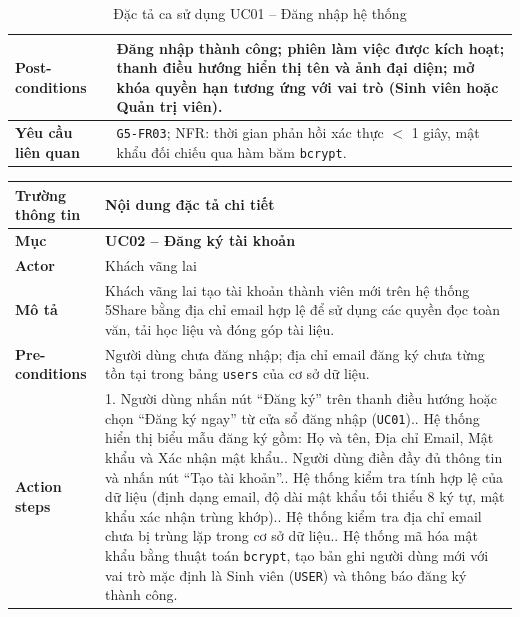 \begin{table}[H]
\begin{tabularx}{\textwidth}{|p{3.5cm}|X|}
\hline
\textbf{Post-conditions} & Đăng nhập thành công; phiên làm việc được kích hoạt; thanh điều hướng hiển thị tên và ảnh đại diện; mở khóa quyền hạn tương ứng với vai trò (Sinh viên hoặc Quản trị viên). \\
\hline
\textbf{Yêu cầu liên quan} & \texttt{G5-FR03}; NFR: thời gian phản hồi xác thực $<$ 1 giây, mật khẩu đối chiếu qua hàm băm \texttt{bcrypt}. \\
\hline
\end{tabularx}
\caption{Đặc tả ca sử dụng UC01 -- Đăng nhập hệ thống}
\label{tab:uc01}
\end{table}


\begin{table}[H]
\centering
\footnotesize\linespread{1.05}\selectfont
\setlength{\tabcolsep}{5pt}
\renewcommand{\arraystretch}{1.12}
\begin{tabularx}{\textwidth}{|p{3.5cm}|X|}
\hline
\rowcolor[HTML]{EAEAEA}
\textbf{Trường thông tin} & \textbf{Nội dung đặc tả chi tiết} \\
\hline
\textbf{Mục} & \textbf{UC02 -- Đăng ký tài khoản} \\
\hline
\textbf{Actor} & Khách vãng lai \\
\hline
\textbf{Mô tả} & Khách vãng lai tạo tài khoản thành viên mới trên hệ thống 5Share bằng địa chỉ email hợp lệ để sử dụng các quyền đọc toàn văn, tải học liệu và đóng góp tài liệu. \\
\hline
\textbf{Pre-conditions} & Người dùng chưa đăng nhập; địa chỉ email đăng ký chưa từng tồn tại trong bảng \texttt{users} của cơ sở dữ liệu. \\
\hline
\textbf{Action steps} & 1. Người dùng nhấn nút ``Đăng ký'' trên thanh điều hướng hoặc chọn ``Đăng ký ngay'' từ cửa sổ đăng nhập (\texttt{UC01}).\newline 2. Hệ thống hiển thị biểu mẫu đăng ký gồm: Họ và tên, Địa chỉ Email, Mật khẩu và Xác nhận mật khẩu.\newline 3. Người dùng điền đầy đủ thông tin và nhấn nút ``Tạo tài khoản''.\newline 4. Hệ thống kiểm tra tính hợp lệ của dữ liệu (định dạng email, độ dài mật khẩu tối thiểu 8 ký tự, mật khẩu xác nhận trùng khớp).\newline 5. Hệ thống kiểm tra địa chỉ email chưa bị trùng lặp trong cơ sở dữ liệu.\newline 6. Hệ thống mã hóa mật khẩu bằng thuật toán \texttt{bcrypt}, tạo bản ghi người dùng mới với vai trò mặc định là Sinh viên (\texttt{USER}) và thông báo đăng ký thành công. \\

\end{tabularx}
\end{table}

